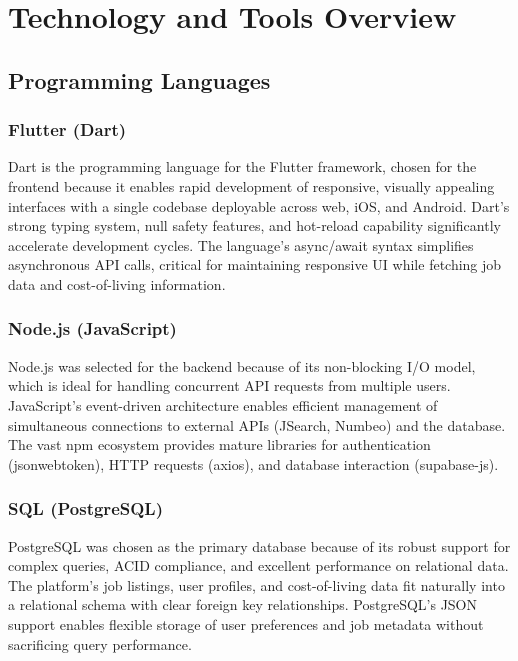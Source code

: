 \documentclass[12pt,a4paper,oneside]{report}
\begin{document}
\chapter{Technology and Tools Overview}

\section{Programming Languages}

\subsection{Flutter (Dart)}

Dart is the programming language for the Flutter framework, chosen for the frontend because it enables rapid development of responsive, visually appealing interfaces with a single codebase deployable across web, iOS, and Android. Dart's strong typing system, null safety features, and hot-reload capability significantly accelerate development cycles. The language's async/await syntax simplifies asynchronous API calls, critical for maintaining responsive UI while fetching job data and cost-of-living information.

\subsection{Node.js (JavaScript)}

Node.js was selected for the backend because of its non-blocking I/O model, which is ideal for handling concurrent API requests from multiple users. JavaScript's event-driven architecture enables efficient management of simultaneous connections to external APIs (JSearch, Numbeo) and the database. The vast npm ecosystem provides mature libraries for authentication (jsonwebtoken), HTTP requests (axios), and database interaction (supabase-js).

\subsection{SQL (PostgreSQL)}

PostgreSQL was chosen as the primary database because of its robust support for complex queries, ACID compliance, and excellent performance on relational data. The platform's job listings, user profiles, and cost-of-living data fit naturally into a relational schema with clear foreign key relationships. PostgreSQL's JSON support enables flexible storage of user preferences and job metadata without sacrificing query performance.
\end{document}
